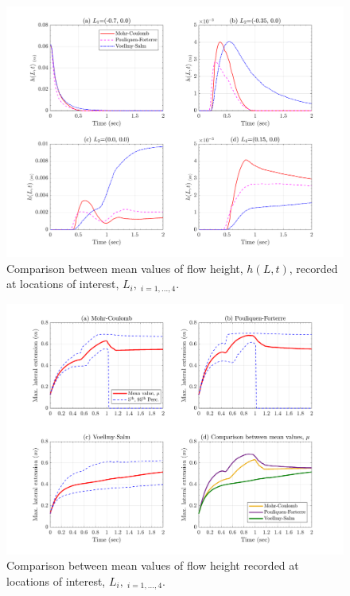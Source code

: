 \documentclass{article}
\begin{document}
\begin{figure}[H]
        \centering
        \includegraphics[width=1\textwidth]{InclinedPlane/Height/H_mean.png}
        \caption{Comparison between mean values of flow height, $h(L,t)$, recorded at locations of interest, $L_i, \ _{i=1,...,4}$.}
        \label{fig:Ramp-LM-H-means}
\end{figure}

\begin{figure}[H]
        \centering
        \includegraphics[width=1\textwidth]{InclinedPlane/Height/LateralExtent_SpatialRec.png}
        \caption{Comparison between mean values of flow height recorded at locations of interest, $L_i, \ _{i=1,...,4}$.}
        \label{fig:Ramp-LatExtension-spatial}
\end{figure}
\end{document}
